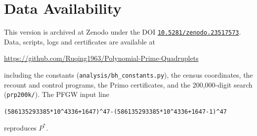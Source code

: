 \documentclass[11pt,a4paper]{article}
\theoremstyle{remark}
\begin{document}
\section*{Data Availability}
This version is archived at Zenodo under the DOI
\href{https://doi.org/10.5281/zenodo.23517573}{\texttt{10.5281/zenodo.23517573}}.
Data, scripts, logs and certificates are available at
\begin{center}
\url{https://github.com/Ruqing1963/Polynomial-Prime-Quadruplets}
\end{center}
including the constants (\texttt{analysis/bh\_constants.py}), the census coordinates, the recount and control programs, the Primo certificates, and the 200,000-digit search (\texttt{prp200k/}). The PFGW input line
\begin{center}
\small\texttt{(586135293385*10\^{}4336+1647)\^{}47-(586135293385*10\^{}4336+1647-1)\^{}47}
\end{center}
reproduces $P^\ast$.
\end{document}
